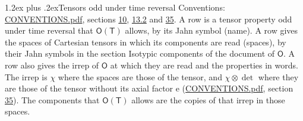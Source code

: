 \documentclass[10pt,a4paper]{article}
\makeatletter
\renewcommand\section{\@startsection{section}{1}{\z@}{-3ex plus -1ex minus -.2ex}%
  {1.2ex plus .2ex}{\normalfont\large\sffamily\bfseries\color{parttitle}}}
\numberwithin{equation}{section}
\newcommand{\grp}[1]{\mathsf{#1}}
\newcommand{\irrprod}{\otimes}
\makeatother
\begin{document}
\section{Tensors odd under time reversal}\label{s:time_odd}
Conventions: \href{../../CONVENTIONS.pdf}{CONVENTIONS.pdf}, sections \href{../../../rotation/CONVENTIONS.pdf\#conv.10}{10}, \href{../../../rotation/CONVENTIONS.pdf\#conv.13.2}{13.2} and \href{../../CONVENTIONS.pdf\#conv.35}{35}.
\leavevmode\label{n:head.name.property}A row is a tensor property odd under time reversal that $\grp{O}(\grp{T})$ allows, by its Jahn symbol (name). \label{n:head.spaces}A row gives the spaces of Cartesian tensors in which its components are read (spaces), by their Jahn symbols in the section Isotypic components of the document of \href{../../../rotation/data/pdf/O.pdf}{$\grp{O}$}. \label{n:head.properties}A row also gives the irrep of $\grp{O}$ at which they are read and the properties in words. The irrep is $\chi$ where the spaces are those of the tensor, and $\chi \irrprod \det$ where they are those of the tensor without its axial factor e (\href{../../CONVENTIONS.pdf}{CONVENTIONS.pdf}, section \href{../../CONVENTIONS.pdf\#conv.35}{35}). The components that $\grp{O}(\grp{T})$ allows are the copies of that irrep in those spaces.
\end{document}

